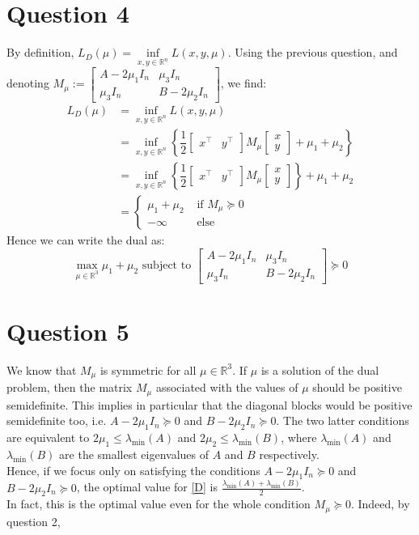 \documentclass{article}
\newcommand{\R}{\mathbb{R}}
\begin{document}
\section*{Question 4}
By definition, $L_D(\mu)=\inf\limits_{x,y\in\R^n} L(x,y,\mu)$. Using the previous question, and denoting $M_\mu:=\begin{bmatrix} A-2\mu_1 I_n & \mu_3 I_n \\
\mu_3 I_n & B-2\mu_2 I_n \end{bmatrix}$, we find:
\begin{align*}
L_D(\mu)&=\inf\limits_{x,y\in\R^n} L(x,y,\mu) \\
&=\inf\limits_{x,y\in\R^n} \left\lbrace \dfrac{1}{2} \begin{bmatrix} x^\top & y^\top\end{bmatrix}M_\mu\begin{bmatrix} x \\ y \end{bmatrix} +\mu_1+\mu_2 \right\rbrace \\
&=\inf\limits_{x,y\in\R^n} \left\lbrace \dfrac{1}{2} \begin{bmatrix} x^\top & y^\top\end{bmatrix}M_\mu\begin{bmatrix} x \\ y \end{bmatrix} \right\rbrace+\mu_1+\mu_2   \\
&=\begin{cases} \mu_1+\mu_2 &\text{ if }M_\mu\succeq 0 \\ -\infty &\text{ else} \end{cases}
\end{align*}
Hence we can write the dual as:
\begin{equation*}\tag{D} \label{D}
\max_{\mu\in\R^3} \mu_1+\mu_2 \text{ subject to } \begin{bmatrix} A-2\mu_1 I_n & \mu_3 I_n \\
\mu_3 I_n & B-2\mu_2 I_n \end{bmatrix} \succeq 0
\end{equation*}

\section*{Question 5}
We know that $M_\mu$ is symmetric for all $\mu\in\R^3$. If $\mu$ is a solution of the dual problem, then the matrix $M_\mu$ associated with the values of $\mu$ should be positive semidefinite. This implies in particular that the diagonal blocks would be positive semidefinite too, i.e. $A-2\mu_1 I_n\succeq 0$ and $B-2\mu_2 I_n \succeq 0$. The two latter conditions are equivalent to $2\mu_1\leq \lambda_{\min} (A)$ and $2\mu_2\leq \lambda_{\min}(B)$, where  $\lambda_{\min} (A)$ and $\lambda_{\min} (B)$ are the smallest eigenvalues of $A$ and $B$ respectively.\\
Hence, if we focus only on satisfying the conditions  $A-2\mu_1 I_n\succeq 0$ and $B-2\mu_2 I_n \succeq 0$, the optimal value for \eqref{D} is $\frac{\lambda_{\min} (A)+\lambda_{\min} (B)}{2}$. \\
In fact, this is the optimal value even for the whole condition $M_\mu\succeq 0$. Indeed, by question 2,
\end{document}

